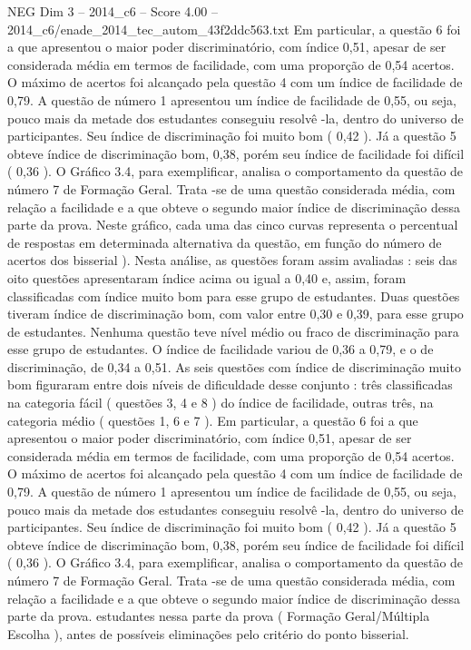 \begin{textsample}{NEG Dim 3 – 2014\_c6 – Score 4.00 – 2014\_c6/enade\_2014\_tec\_autom\_43f2ddc563.txt}
Em particular, a questão 6 foi a que apresentou o maior poder discriminatório, com índice 0,51, apesar de ser considerada média em termos de facilidade, com uma proporção de 0,54 acertos.
O máximo de acertos foi alcançado pela questão 4 com um índice de facilidade de 0,79.
A questão de número 1 apresentou um índice de facilidade de 0,55, ou seja, pouco mais da metade dos estudantes conseguiu resolvê -la, dentro do universo de participantes.
Seu índice de discriminação foi muito bom ( 0,42 ).
Já a questão 5 obteve índice de discriminação bom, 0,38, porém seu índice de facilidade foi difícil ( 0,36 ).
O Gráfico 3.4, para exemplificar, analisa o comportamento da questão de número 7 de Formação Geral.
Trata -se de uma questão considerada média, com relação a facilidade e a que obteve o segundo maior índice de discriminação dessa parte da prova.
Neste gráfico, cada uma das cinco curvas representa o percentual de respostas em determinada alternativa da questão, em função do número de acertos dos bisserial ).
Nesta análise, as questões foram assim avaliadas : seis das oito questões apresentaram índice acima ou igual a 0,40 e, assim, foram classificadas com índice muito bom para esse grupo de estudantes.
Duas questões tiveram índice de discriminação bom, com valor entre 0,30 e 0,39, para esse grupo de estudantes.
Nenhuma questão teve nível médio ou fraco de discriminação para esse grupo de estudantes.
O índice de facilidade variou de 0,36 a 0,79, e o de discriminação, de 0,34 a 0,51.
As seis questões com índice de discriminação muito bom figuraram entre dois níveis de dificuldade desse conjunto : três classificadas na categoria fácil ( questões 3, 4 e 8 ) do índice de facilidade, outras três, na categoria médio ( questões 1, 6 e 7 ).
Em particular, a questão 6 foi a que apresentou o maior poder discriminatório, com índice 0,51, apesar de ser considerada média em termos de facilidade, com uma proporção de 0,54 acertos.
O máximo de acertos foi alcançado pela questão 4 com um índice de facilidade de 0,79.
A questão de número 1 apresentou um índice de facilidade de 0,55, ou seja, pouco mais da metade dos estudantes conseguiu resolvê -la, dentro do universo de participantes.
Seu índice de discriminação foi muito bom ( 0,42 ).
Já a questão 5 obteve índice de discriminação bom, 0,38, porém seu índice de facilidade foi difícil ( 0,36 ).
O Gráfico 3.4, para exemplificar, analisa o comportamento da questão de número 7 de Formação Geral.
Trata -se de uma questão considerada média, com relação a facilidade e a que obteve o segundo maior índice de discriminação dessa parte da prova. estudantes nessa parte da prova ( Formação Geral/Múltipla Escolha ), antes de possíveis eliminações pelo critério do ponto bisserial.

\end{textsample}
